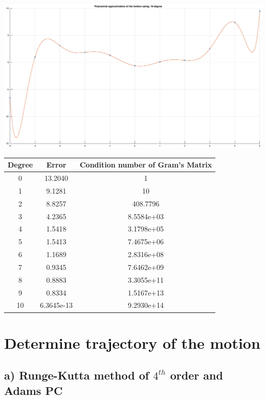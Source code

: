 \documentclass[12pt]{report}
\begin{document}
\begin{center}
   \includegraphics[scale=0.25]{110.eps}
\end{center}

\begin{center}
  \begin{tabular}{| c | c | c |}
\hline

Degree & Error & Condition number of Gram's Matrix \\
\hline
0& 13.2040& 1\\
\hline
1& 9.1281& 10\\
\hline
2& 8.8257&   408.7796\\
\hline
3& 4.2365& 8.5584e+03\\
\hline
4& 1.5418&  3.1798e+05\\
\hline
5& 1.5413& 7.4675e+06\\
\hline
6& 1.1689& 2.8316e+08\\
\hline
7& 0.9345& 7.6462e+09\\
\hline
8& 0.8883& 3.3055e+11\\
\hline
9& 0.8334& 1.5167e+13\\
\hline
10& 6.3645e-13& 9.2930e+14\\
\hline
  \end{tabular}
\end{center}







\chapter{Determine trajectory of the motion}


\section{a) Runge-Kutta method of $4^{th}$ order and Adams PC}
\end{document}

